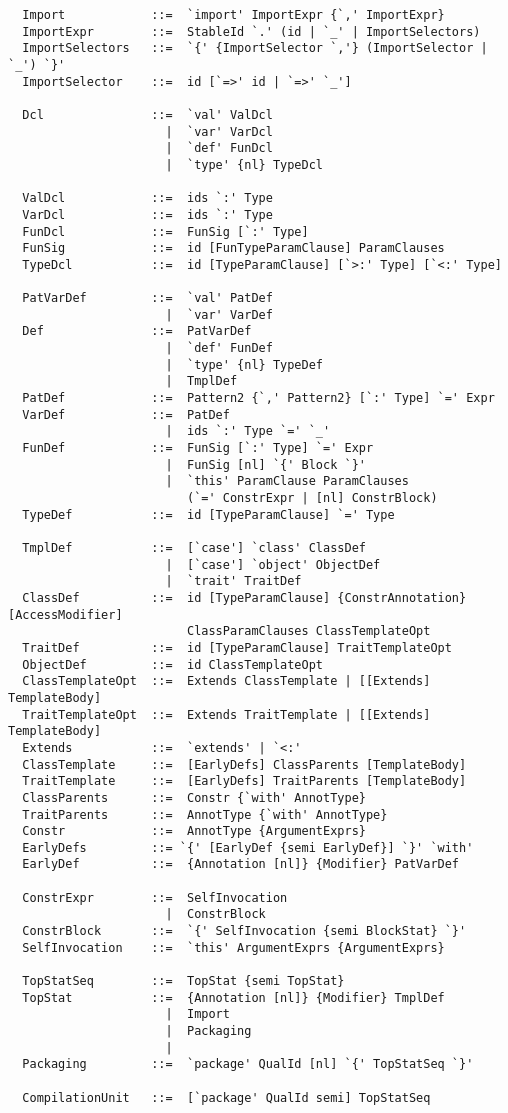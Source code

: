 {\begin{lstlisting}
  Import            ::=  `import' ImportExpr {`,' ImportExpr}
  ImportExpr        ::=  StableId `.' (id | `_' | ImportSelectors)
  ImportSelectors   ::=  `{' {ImportSelector `,'} (ImportSelector | `_') `}'
  ImportSelector    ::=  id [`=>' id | `=>' `_']

  Dcl               ::=  `val' ValDcl
                      |  `var' VarDcl
                      |  `def' FunDcl
                      |  `type' {nl} TypeDcl

  ValDcl            ::=  ids `:' Type
  VarDcl            ::=  ids `:' Type
  FunDcl            ::=  FunSig [`:' Type]
  FunSig            ::=  id [FunTypeParamClause] ParamClauses
  TypeDcl           ::=  id [TypeParamClause] [`>:' Type] [`<:' Type]

  PatVarDef         ::=  `val' PatDef
                      |  `var' VarDef
  Def               ::=  PatVarDef
                      |  `def' FunDef
                      |  `type' {nl} TypeDef
                      |  TmplDef
  PatDef            ::=  Pattern2 {`,' Pattern2} [`:' Type] `=' Expr
  VarDef            ::=  PatDef
                      |  ids `:' Type `=' `_'
  FunDef            ::=  FunSig [`:' Type] `=' Expr
                      |  FunSig [nl] `{' Block `}'
                      |  `this' ParamClause ParamClauses 
                         (`=' ConstrExpr | [nl] ConstrBlock)
  TypeDef           ::=  id [TypeParamClause] `=' Type

  TmplDef           ::=  [`case'] `class' ClassDef
                      |  [`case'] `object' ObjectDef
                      |  `trait' TraitDef
  ClassDef          ::=  id [TypeParamClause] {ConstrAnnotation} [AccessModifier] 
                         ClassParamClauses ClassTemplateOpt 
  TraitDef          ::=  id [TypeParamClause] TraitTemplateOpt
  ObjectDef         ::=  id ClassTemplateOpt
  ClassTemplateOpt  ::=  Extends ClassTemplate | [[Extends] TemplateBody]
  TraitTemplateOpt  ::=  Extends TraitTemplate | [[Extends] TemplateBody]
  Extends           ::=  `extends' | `<:'
  ClassTemplate     ::=  [EarlyDefs] ClassParents [TemplateBody]
  TraitTemplate     ::=  [EarlyDefs] TraitParents [TemplateBody]
  ClassParents      ::=  Constr {`with' AnnotType}
  TraitParents      ::=  AnnotType {`with' AnnotType}
  Constr            ::=  AnnotType {ArgumentExprs}
  EarlyDefs         ::= `{' [EarlyDef {semi EarlyDef}] `}' `with'
  EarlyDef          ::=  {Annotation [nl]} {Modifier} PatVarDef

  ConstrExpr        ::=  SelfInvocation 
                      |  ConstrBlock
  ConstrBlock       ::=  `{' SelfInvocation {semi BlockStat} `}'
  SelfInvocation    ::=  `this' ArgumentExprs {ArgumentExprs}

  TopStatSeq        ::=  TopStat {semi TopStat}
  TopStat           ::=  {Annotation [nl]} {Modifier} TmplDef
                      |  Import
                      |  Packaging
                      |
  Packaging         ::=  `package' QualId [nl] `{' TopStatSeq `}'

  CompilationUnit   ::=  [`package' QualId semi] TopStatSeq
\end{lstlisting}
}

